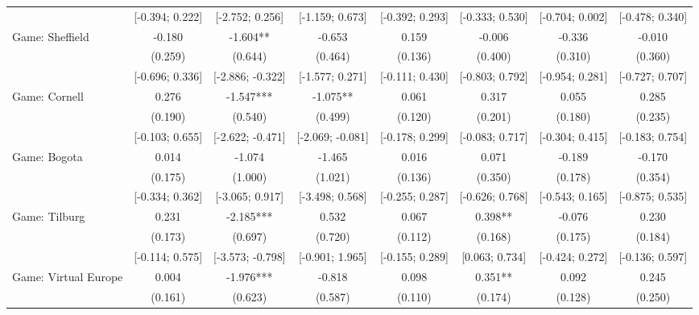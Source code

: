 \begin{tabular}{l*{7}{c}}
                    &[-0.394; 0.222]   &[-2.752; 0.256]   &[-1.159; 0.673]   &[-0.392; 0.293]   &[-0.333; 0.530]   &[-0.704; 0.002]   &[-0.478; 0.340]   \\
Game: Sheffield     &      -0.180   &      -1.604** &      -0.653   &       0.159   &      -0.006   &      -0.336   &      -0.010   \\
                    &     (0.259)   &     (0.644)   &     (0.464)   &     (0.136)   &     (0.400)   &     (0.310)   &     (0.360)   \\
                    &[-0.696; 0.336]   &[-2.886; -0.322]   &[-1.577; 0.271]   &[-0.111; 0.430]   &[-0.803; 0.792]   &[-0.954; 0.281]   &[-0.727; 0.707]   \\
Game: Cornell       &       0.276   &      -1.547***&      -1.075** &       0.061   &       0.317   &       0.055   &       0.285   \\
                    &     (0.190)   &     (0.540)   &     (0.499)   &     (0.120)   &     (0.201)   &     (0.180)   &     (0.235)   \\
                    &[-0.103; 0.655]   &[-2.622; -0.471]   &[-2.069; -0.081]   &[-0.178; 0.299]   &[-0.083; 0.717]   &[-0.304; 0.415]   &[-0.183; 0.754]   \\
Game: Bogota        &       0.014   &      -1.074   &      -1.465   &       0.016   &       0.071   &      -0.189   &      -0.170   \\
                    &     (0.175)   &     (1.000)   &     (1.021)   &     (0.136)   &     (0.350)   &     (0.178)   &     (0.354)   \\
                    &[-0.334; 0.362]   &[-3.065; 0.917]   &[-3.498; 0.568]   &[-0.255; 0.287]   &[-0.626; 0.768]   &[-0.543; 0.165]   &[-0.875; 0.535]   \\
Game: Tilburg       &       0.231   &      -2.185***&       0.532   &       0.067   &       0.398** &      -0.076   &       0.230   \\
                    &     (0.173)   &     (0.697)   &     (0.720)   &     (0.112)   &     (0.168)   &     (0.175)   &     (0.184)   \\
                    &[-0.114; 0.575]   &[-3.573; -0.798]   &[-0.901; 1.965]   &[-0.155; 0.289]   &[0.063; 0.734]   &[-0.424; 0.272]   &[-0.136; 0.597]   \\
Game: Virtual Europe&       0.004   &      -1.976***&      -0.818   &       0.098   &       0.351** &       0.092   &       0.245   \\
                    &     (0.161)   &     (0.623)   &     (0.587)   &     (0.110)   &     (0.174)   &     (0.128)   &     (0.250)   \\

\end{tabular}
